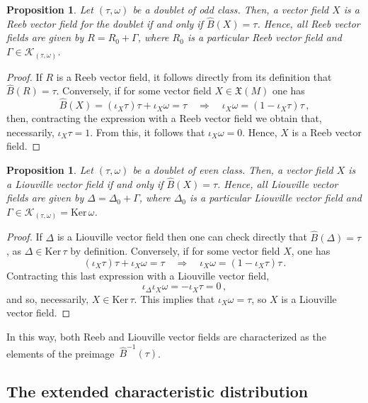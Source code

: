 \documentclass[11pt,twoside]{article}
\theoremstyle{plain}
\newtheorem{proposition}[theorem]{Proposition}
\theoremstyle{definition}
\newcommand*{\inn}[1]{\iota_{#1}}
\newcommand{\X}{\mathfrak{X}}
\def\X{\mathfrak{X}}
\def\Ker{\mathrm{Ker \,}}
\def\K{\mathcal{K}}
\begin{document}
\begin{proposition}
\label{reeb_structure}
    Let $(\tau,\omega)$ be a doublet of odd class. Then, a vector field $X$ is a Reeb vector field for the doublet if and only if $\widehat B(X) = \tau$. Hence, all Reeb vector fields are given by $R=R_0+\Gamma$, where $R_0$ is a particular Reeb vector field and $\Gamma\in\K_{(\tau,\omega)}$.
\end{proposition}
\begin{proof}
    If $R$ is a Reeb vector field, it follows directly from its definition that $\widehat B(R)=\tau$. Conversely, if for some vector field $X\in \X (M)$ one has
    $$\widehat B(X) =  (\inn{X}\tau)\tau+\inn{X}\omega =\tau\quad \Longrightarrow\quad \inn{X}\omega=(1-\inn{X}\tau)\tau\,,$$
    then, contracting the expression with a Reeb vector field we obtain that, necessarily, $\inn{X}\tau=1$. From this, it follows that $\inn{X}\omega=0$. Hence, $X$ is a Reeb vector field.
\end{proof}
\begin{proposition}\label{prop:liouville_structure}
    Let $(\tau,\omega)$ be a doublet of even class. Then, a vector field $X$ is a Liouville vector field if and only if $\widehat B(X) = \tau$. Hence, all Liouville vector fields are given by $\Delta=\Delta_0+\Gamma$, where $\Delta_0$ is a particular Liouville vector field and $\Gamma\in\K_{(\tau,\omega)}=\Ker\omega$.
\end{proposition}
\begin{proof}
    If $\Delta$ is a Liouville vector field then one can check directly that $\widehat B(\Delta)=\tau$, as $\Delta\in \Ker\tau$ by definition. Conversely, if for some vector field $X$, one has
    $$  (\inn{X}\tau)\tau+\inn{X}\omega=\tau\quad \Longrightarrow\quad \inn{X}\omega=(1-\inn{X}\tau)\tau\,.$$
     Contracting this last expression with a Liouville vector field, 
    $$\inn{\Delta}\inn{X}\omega = -\inn{X}\tau=0\,,$$
    and so, necessarily, $X\in\Ker\tau$. This implies that $\inn{X}\omega=\tau$, so $X$ is a Liouville vector field.
\end{proof}
In this way, both Reeb and Liouville vector fields are characterized as the elements of the preimage~$\widehat B^{-1}(\tau)$. 


\subsection{The extended characteristic distribution}
\end{document}
